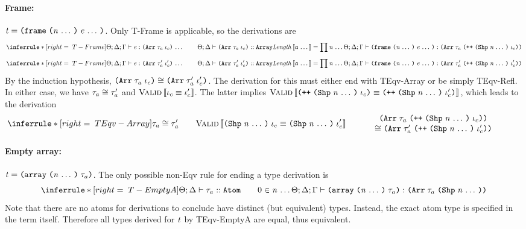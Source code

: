 \begin{sproof}
  \paragraph{Frame:}
  $\term = \frm{\sequence{\expr}}{\sequence{\nat}}$.
  Only {\sc T-Frame} is applicable, so the derivations are
  \[\infr[T-Frame]
  {\sequence{\typeof
      {\sEnv}{\kEnv}{\tEnv}
      {\expr}{\typearray{\type_a}{\idx_c}}}
    \qquad \kindof{\sEnv}{\kEnv}{\typearray{\type_a}{\idx_c}}{\kindarray}
    \\\\ \mathit{Length}\llb \sequence{\atom} \rrb = \prod{\sequence{\nat}}}
  {\typeof{\sEnv}{\kEnv}{\tEnv}
    {\frm{\sequence{\expr}}{\sequence{\nat}}}
    {\typearray
      {\type_a}
      {\idxappend{\idxshape{\sequence{\nat}} \; \idx_c}}}}\]
  \ctrand
  \[\infr[T-Frame]
  {\sequence{\typeof
      {\sEnv}{\kEnv}{\tEnv}
      {\expr}{\typearray{\type_a'}{\idx_c'}}}
    \qquad \kindof{\sEnv}{\kEnv}{\typearray{\type_a'}{\idx_c'}}{\kindarray}
    \\\\ \mathit{Length}\llb \sequence{\atom} \rrb = \prod{\sequence{\nat}}}
  {\typeof{\sEnv}{\kEnv}{\tEnv}
    {\frm{\sequence{\expr}}{\sequence{\nat}}}
    {\typearray
      {\type_a'}
      {\idxappend{\idxshape{\sequence{\nat}} \; \idx_c'}}}}\]
  By the induction hypothesis,
  $\teqv {\typearray{\type_a}{\idx_c}}{\typearray{\type_a'}{\idx_c'}}$.
  The derivation for this must either end with {\sc TEqv-Array}
  or be simply {\sc TEqv-Refl}.
  In either case, we have $\mathit{\tau}_a \cong \mathit{\tau}_a'$
  and $\text{\sc Valid} \left\llbracket \mathit{\iota}_c \equiv \mathit{\iota}_c' \right\rrbracket$.
  The latter implies
  $\ieqv
  {\idxappend{\idxshape{\sequence{\nat}} \; \idx_c}}
  {\idxappend{\idxshape{\sequence{\nat}} \; \idx_c'}}$,
  which leads to the derivation
  \[\infr[TEqv-Array]
  {\teqv{\type_a}{\type_a'}
    \qquad
    \ieqv{\idxshape{\sequence{\nat}} \; \idx_c}{\idxshape{\sequence{\nat}} \; \idx_c'}}
  {\parbox{0.6\textwidth}
    {\centering
      \({\typearray{\type_a}{\idxappend{\idxshape{\sequence{\nat}} \; \idx_c}}}\)\\
      \(\teqv{}{}{\typearray{\type_a'}{\idxappend{\idxshape{\sequence{\nat}} \; \idx_c'}}}\)}}\]
  \paragraph{Empty array:}
  $\term = \emptyarrlit{\type_a}{\sequence{\nat}}$.
  The only possible non-{\sc Eqv} rule for ending a type derivation is
  \[\infr[T-EmptyA]
  {\kindof{\sEnv}{\kEnv}{\type_a}{\kindatom}
    \qquad 0 \in \sequence{\nat}}
  {\typeof{\sEnv}{\kEnv}{\tEnv}
    {\emptyarrlit{\type_a}{\sequence{\nat}}}
    {\typearray{\type_a}{\idxshape{\sequence{\nat}}}}}\]
  Note that there are no atoms for derivations to conclude
  have distinct (but equivalent) types.
  Instead, the exact atom type is specified in the term itself.
  Therefore all types derived for $\mathit{t}$ by {\sc TEqv-EmptyA} are equal,
  thus equivalent.

\end{sproof}
